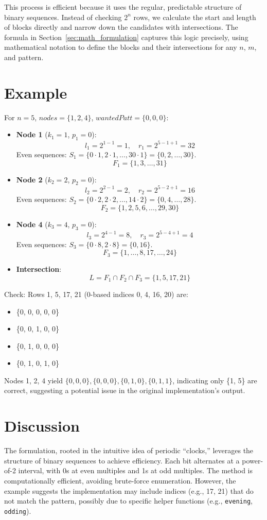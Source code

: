 \documentclass[12pt]{article}
\begin{document}
This process is efficient because it uses the regular, predictable structure of binary sequences. Instead of checking \( 2^n \) rows, we calculate the start and length of blocks directly and narrow down the candidates with intersections. The formula in Section~\ref{sec:math_formulation} captures this logic precisely, using mathematical notation to define the blocks and their intersections for any \( n \), \( m \), and pattern.

\section{Example}
For \( n = 5 \), \( nodes = \{1, 2, 4\} \), \( wantedPatt = \{0, 0, 0\} \):
\begin{itemize}
    \item \textbf{Node 1} (\( k_1 = 1 \), \( p_1 = 0 \)):
    \[
    l_1 = 2^{1-1} = 1, \quad r_1 = 2^{5-1+1} = 32
    \]
    Even sequences: \( S_1 = \{0 \cdot 1, 2 \cdot 1, \dots, 30 \cdot 1\} = \{0, 2, \dots, 30\} \).
    \[
    F_1 = \{1, 3, \dots, 31\}
    \]
    \item \textbf{Node 2} (\( k_2 = 2 \), \( p_2 = 0 \)):
    \[
    l_2 = 2^{2-1} = 2, \quad r_2 = 2^{5-2+1} = 16
    \]
    Even sequences: \( S_2 = \{0 \cdot 2, 2 \cdot 2, \dots, 14 \cdot 2\} = \{0, 4, \dots, 28\} \).
    \[
    F_2 = \{1, 2, 5, 6, \dots, 29, 30\}
    \]
    \item \textbf{Node 4} (\( k_3 = 4 \), \( p_3 = 0 \)):
    \[
    l_3 = 2^{4-1} = 8, \quad r_3 = 2^{5-4+1} = 4
    \]
    Even sequences: \( S_3 = \{0 \cdot 8, 2 \cdot 8\} = \{0, 16\} \).
    \[
    F_3 = \{1, \dots, 8, 17, \dots, 24\}
    \]
    \item \textbf{Intersection}:
    \[
    L = F_1 \cap F_2 \cap F_3 = \{1, 5, 17, 21\}
    \]
\end{itemize}
Check: Rows 1, 5, 17, 21 (0-based indices 0, 4, 16, 20) are:
\begin{itemize}
    \item  \{0, 0, 0, 0, 0\} 
    \item  \{0, 0, 1, 0, 0\}
    \item  \{0, 1, 0, 0, 0\}
    \item  \{0, 1, 0, 1, 0\} 
\end{itemize}
Nodes 1, 2, 4 yield \( \{0, 0, 0\}, \{0, 0, 0\}, \{0, 1, 0\}, \{0, 1, 1\} \), indicating only \{1, 5\} are correct, suggesting a potential issue in the original implementation’s output.

\section{Discussion}
The formulation, rooted in the intuitive idea of periodic ``clocks,'' leverages the structure of binary sequences to achieve efficiency. Each bit alternates at a power-of-2 interval, with 0s at even multiples and 1s at odd multiples. The method is computationally efficient, avoiding brute-force enumeration. However, the example suggests the implementation may include indices (e.g., 17, 21) that do not match the pattern, possibly due to specific helper functions (e.g., \texttt{evening}, \texttt{odding}).
\end{document}
